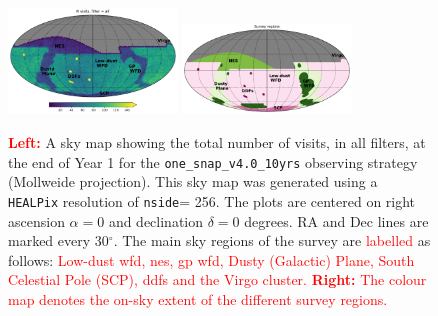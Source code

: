 \documentclass[preprintm,linenumbers]{aastex631}
\newcommand{\baselinefull}{\texttt{one\_snap\_v4.0\_10yrs}\xspace}
\newcommand{\nside}{\texttt{nside}\xspace}
\newcommand{\healpix}{\texttt{HEALPix}\xspace} %
\providecommand{\red}[1]{\textcolor{red}{#1}}
\begin{document}
		\begin{figure}
		\centering
  \includegraphics[width=0.4\textwidth,valign=t]{results/skymaps/skymap_first_year_one_snap_v4_0_10yrs_nside-256_CountMetric_all_noDD_noTwi.pdf}
  \includegraphics[width=0.4\textwidth,valign=t]{results/skymaps/skymap_first_year_one_snap_v4_0_10yrs_nside-256_CountMetric_all_noDD_noTwi_bounds.pdf}
				\caption{\red{\textbf{Left:}} A sky map showing the total number of visits, in all filters, at the end of Year 1 for the \baselinefull observing strategy (Mollweide projection). 
    This sky map was generated using a \healpix \citep[Hierarchical Equal Area isoLatitude Pixelization; ][]{2005ApJ...622..759G}  resolution of \nside = 256.
    The plots are centered on right ascension $\alpha = 0$ and declination $\delta = 0$ degrees. RA and Dec lines are marked every 30$^\circ$.
    The main sky regions of the survey are \red{labelled} as follows: \red{Low-dust \gls*{wfd}, \gls*{nes}, \glsreset{gp}\gls*{gp} \gls*{wfd}, Dusty (Galactic) Plane, South Celestial Pole (SCP), \glsreset{ddf}\glspl*{ddf} and the Virgo cluster.}
    \red{\textbf{Right:} The colour map denotes the on-sky extent of the different survey regions.}
    }
    \label{fig:baseline_labels}
		\end{figure}
  
\end{document}
